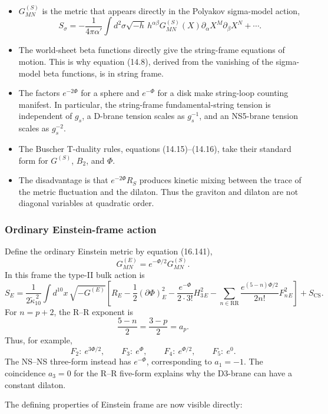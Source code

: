 \documentclass[
  10pt,
  a4paper,
  openany]{book}
\providecommand{\tightlist}{%
  \setlength{\itemsep}{0pt}\setlength{\parskip}{0pt}}
\begin{document}
\begin{itemize}
\tightlist
\item
  \(G^{(S)}_{MN}\) is the metric that appears directly in the Polyakov
  sigma-model action, \[
  S_{\sigma}= -\frac1{4\pi\alpha'}
  \int d^2\sigma\sqrt{-h}\,h^{\alpha\beta}
  G^{(S)}_{MN}(X)\partial_\alpha X^M\partial_\beta X^N+\cdots.
  \]
\item
  The world-sheet beta functions directly give the string-frame
  equations of motion. This is why equation (14.8), derived from the
  vanishing of the sigma-model beta functions, is in string frame.
\item
  The factors \(e^{-2\Phi}\) for a sphere and \(e^{-\Phi}\) for a disk
  make string-loop counting manifest. In particular, the string-frame
  fundamental-string tension is independent of \(g_s\), a D-brane
  tension scales as \(g_s^{-1}\), and an NS5-brane tension scales as
  \(g_s^{-2}\).
\item
  The Buscher T-duality rules, equations (14.15)--(14.16), take their
  standard form for \(G^{(S)}\), \(B_2\), and \(\Phi\).
\item
  The disadvantage is that \(e^{-2\Phi}R_S\) produces kinetic mixing
  between the trace of the metric fluctuation and the dilaton. Thus the
  graviton and dilaton are not diagonal variables at quadratic order.
\end{itemize}

\subsubsection{Ordinary Einstein-frame
action}\label{ordinary-einstein-frame-action}

Define the ordinary Einstein metric by equation (16.141), \[
\boxed{G^{(E)}_{MN}=e^{-\Phi/2}G^{(S)}_{MN}}.
\] In this frame the type-II bulk action is \[
S_E
=\frac1{2\widetilde\kappa_{10}^{\,2}}
\int d^{10}x\,\sqrt{-G^{(E)}}
\left[
R_E
-\frac12(\partial\Phi)^2_E
-\frac{e^{-\Phi}}{2\cdot3!}H_3^2{}_E
-\sum_{n\in\mathrm{RR}}
\frac{e^{(5-n)\Phi/2}}{2n!}F_n^2{}_E
\right]
+S_{\mathrm{CS}}.
\] For \(n=p+2\), the R--R exponent is \[
\frac{5-n}{2}=\frac{3-p}{2}=a_p.
\] Thus, for example, \[
F_2:\ e^{3\Phi/2},
\qquad
F_3:\ e^{\Phi},
\qquad
F_4:\ e^{\Phi/2},
\qquad
F_5:\ e^0.
\] The NS--NS three-form instead has \(e^{-\Phi}\), corresponding to
\(a_1=-1\). The coincidence \(a_3=0\) for the R--R five-form explains
why the D3-brane can have a constant dilaton.

The defining properties of Einstein frame are now visible directly:
\end{document}
